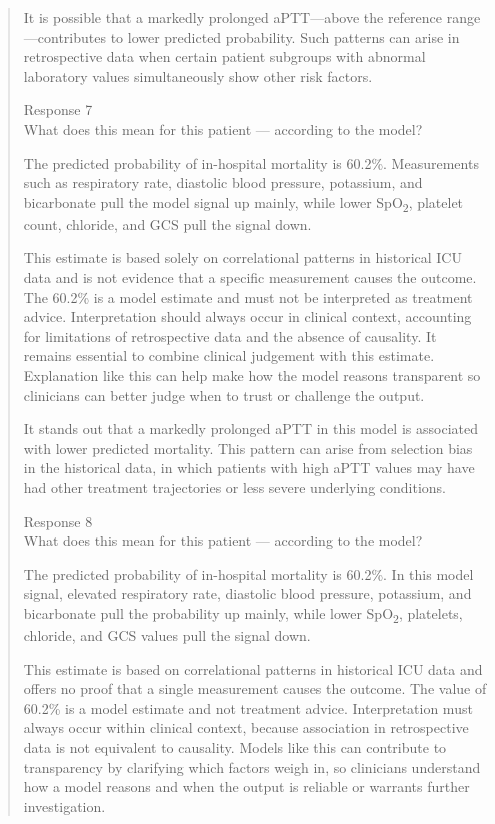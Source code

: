 \documentclass[12pt, a4paper]{article}
\begin{document}
\begin{quote}
It is possible that a markedly prolonged aPTT---above the reference range---contributes to lower predicted probability. Such patterns can arise in retrospective data when certain patient subgroups with abnormal laboratory values simultaneously show other risk factors.

Response 7\\
What does this mean for this patient --- according to the model?

The predicted probability of in-hospital mortality is 60.2\%. Measurements such as respiratory rate, diastolic blood pressure, potassium, and bicarbonate pull the model signal up mainly, while lower SpO\textsubscript{2}, platelet count, chloride, and GCS pull the signal down.

This estimate is based solely on correlational patterns in historical ICU data and is not evidence that a specific measurement causes the outcome. The 60.2\% is a model estimate and must not be interpreted as treatment advice. Interpretation should always occur in clinical context, accounting for limitations of retrospective data and the absence of causality. It remains essential to combine clinical judgement with this estimate. Explanation like this can help make how the model reasons transparent so clinicians can better judge when to trust or challenge the output.

It stands out that a markedly prolonged aPTT in this model is associated with lower predicted mortality. This pattern can arise from selection bias in the historical data, in which patients with high aPTT values may have had other treatment trajectories or less severe underlying conditions.

Response 8\\
What does this mean for this patient --- according to the model?

The predicted probability of in-hospital mortality is 60.2\%. In this model signal, elevated respiratory rate, diastolic blood pressure, potassium, and bicarbonate pull the probability up mainly, while lower SpO\textsubscript{2}, platelets, chloride, and GCS values pull the signal down.

This estimate is based on correlational patterns in historical ICU data and offers no proof that a single measurement causes the outcome. The value of 60.2\% is a model estimate and not treatment advice. Interpretation must always occur within clinical context, because association in retrospective data is not equivalent to causality. Models like this can contribute to transparency by clarifying which factors weigh in, so clinicians understand how a model reasons and when the output is reliable or warrants further investigation.


\end{quote}
\end{document}

